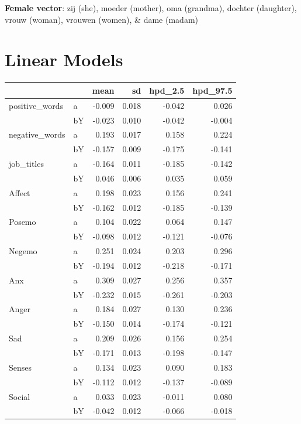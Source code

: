 \documentclass[11pt,a4paper]{article}
\begin{document}
\textbf{Female vector}: zij (she), moeder (mother), oma (grandma), dochter (daughter), vrouw (woman), vrouwen (women), \& dame (madam)


\clearpage
\onecolumn
\section{Linear Models}
\tiny
\begin{longtable}{llrrrr}
\toprule
      &    &   mean &     sd &  hpd\_2.5 &  hpd\_97.5 \\
\midrule
positive\_words & a & -0.009 &  0.018 &   -0.042 &     0.026 \\
      & bY & -0.023 &  0.010 &   -0.042 &    -0.004 \\
negative\_words & a &  0.193 &  0.017 &    0.158 &     0.224 \\
      & bY & -0.157 &  0.009 &   -0.175 &    -0.141 \\
job\_titles & a & -0.164 &  0.011 &   -0.185 &    -0.142 \\
      & bY &  0.046 &  0.006 &    0.035 &     0.059 \\
Affect & a &  0.198 &  0.023 &    0.156 &     0.241 \\
      & bY & -0.162 &  0.012 &   -0.185 &    -0.139 \\
Posemo & a &  0.104 &  0.022 &    0.064 &     0.147 \\
      & bY & -0.098 &  0.012 &   -0.121 &    -0.076 \\
Negemo & a &  0.251 &  0.024 &    0.203 &     0.296 \\
      & bY & -0.194 &  0.012 &   -0.218 &    -0.171 \\
Anx & a &  0.309 &  0.027 &    0.256 &     0.357 \\
      & bY & -0.232 &  0.015 &   -0.261 &    -0.203 \\
Anger & a &  0.184 &  0.027 &    0.130 &     0.236 \\
      & bY & -0.150 &  0.014 &   -0.174 &    -0.121 \\
Sad & a &  0.209 &  0.026 &    0.156 &     0.254 \\
      & bY & -0.171 &  0.013 &   -0.198 &    -0.147 \\
Senses & a &  0.134 &  0.023 &    0.090 &     0.183 \\
      & bY & -0.112 &  0.012 &   -0.137 &    -0.089 \\
Social & a &  0.033 &  0.023 &   -0.011 &     0.080 \\
      & bY & -0.042 &  0.012 &   -0.066 &    -0.018 \\

\end{longtable}
\end{document}
